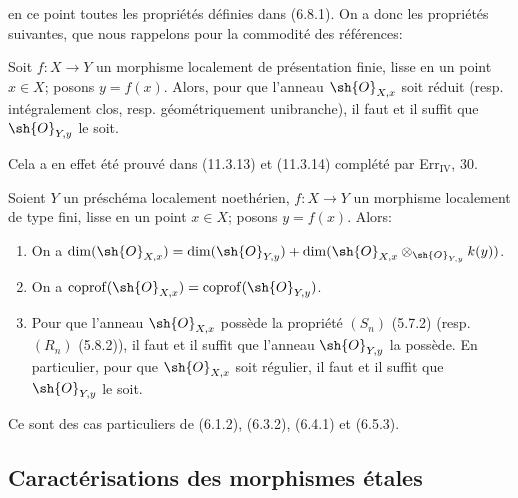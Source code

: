 en ce point toutes les propriétés définies dans (6.8.1). On a donc les propriétés suivantes, que nous rappelons pour la commodité des références:

\begin{proposition}[17.5.7]
\label{IV.17.5.7}
Soit $f:X\to Y$ un morphisme localement de présentation finie, lisse en un point $x\in X$; posons $y=f(x)$. Alors, pour que l'anneau $\sh{O}_{X,x}$ soit réduit (resp. intégralement clos, resp. géométriquement unibranche), il faut et il suffit que $\sh{O}_{Y,y}$ le soit.
\end{proposition}

Cela a en effet été prouvé dans (11.3.13) et (11.3.14) complété par Err$_{\mathrm{IV}}$, 30.

\begin{proposition}[17.5.8]
\label{IV.17.5.8}
Soient $Y$ un préschéma localement noethérien, $f:X\to Y$ un morphisme localement de type fini, lisse en un point $x\in X$; posons $y=f(x)$. Alors:
\begin{enumerate}
  \item[(i)] On a $\dim(\sh{O}_{X,x})=\dim(\sh{O}_{Y,y})+\dim(\sh{O}_{X,x}\otimes_{\sh{O}_{Y,y}}k(y))$.
  \item[(ii)] On a $\operatorname{coprof}(\sh{O}_{X,x})=\operatorname{coprof}(\sh{O}_{Y,y})$.
  \item[(iii)] Pour que l'anneau $\sh{O}_{X,x}$ possède la propriété $(S_n)$ (5.7.2) (resp. $(R_n)$ (5.8.2)), il faut et il suffit que l'anneau $\sh{O}_{Y,y}$ la possède. En particulier, pour que $\sh{O}_{X,x}$ soit régulier, il faut et il suffit que $\sh{O}_{Y,y}$ le soit.
\end{enumerate}
\end{proposition}

Ce sont des cas particuliers de (6.1.2), (6.3.2), (6.4.1) et (6.5.3).

\subsection{Caractérisations des morphismes étales}

